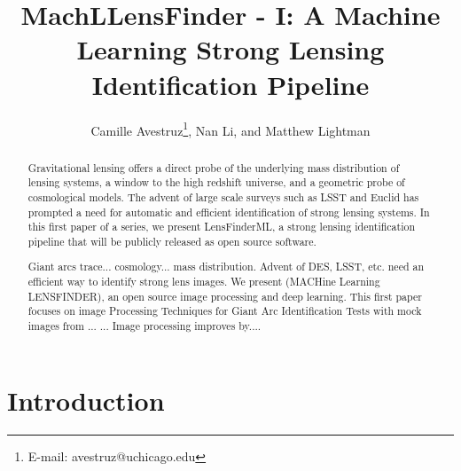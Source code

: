 \documentclass{emulateapj}
\begin{document}
 

\title{MachLLensFinder - I: A Machine Learning Strong Lensing
  Identification Pipeline}

\author{Camille Avestruz\thanks{E-mail:
    avestruz@uchicago.edu}, Nan Li, and Matthew Lightman }


  
\begin{abstract} 
  Gravitational lensing offers a direct probe of the underlying mass
  distribution of lensing systems, a window to the high redshift
  universe, and a geometric probe of cosmological models.  The advent
  of large scale surveys such as LSST and Euclid has prompted a need
  for automatic and efficient identification of strong lensing
  systems.  In this first paper of a series, we present LensFinderML,
  a strong lensing identification pipeline that will be publicly
  released as open source software.

Giant arcs trace... cosmology... mass distribution.  Advent of DES,
LSST, etc. need an efficient way to identify strong lens images.  We
present {} (MACHine Learning LENSFINDER), an open source
image processing and deep learning.  This first paper focuses on image
Processing Techniques for Giant Arc Identification Tests with mock
images from ... ...  Image processing improves by....
\end{abstract}

\section{Introduction}
\end{document}
